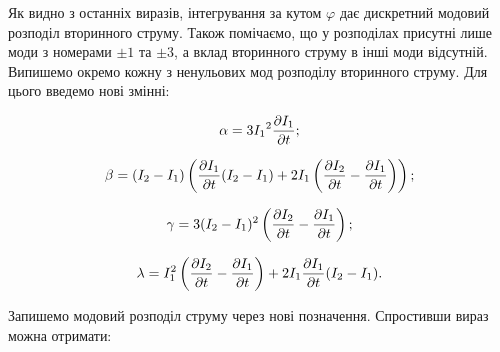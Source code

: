 Як видно з останніх виразів, інтегрування за кутом $ \varphi $ дає дискретний 
модовий розподіл вторинного струму.  Також помічаємо, що у розподілах присутні 
лише моди з номерами $ \pm 1 $ та $ \pm 3 $, а вклад вторинного струму в 
інші моди відсутній. Випишемо окремо кожну з ненульових мод розподілу 
вторинного струму. Для цього введемо нові змінні:

\begin{equation} \begin{aligned} \label{eq:alpha}
\alpha = 3 {I_1}^2 \frac{\partial I_1}{\partial t};
\end{aligned} \end{equation}

\begin{equation} \begin{aligned} \label{eq:beta}
\beta = ( I_2 - I_1 ) \left( \frac{\partial I_1}{\partial t} ( I_2 - I_1 ) + 
2 I_1 \left( \frac{\partial I_2}{\partial t} - \frac{\partial I_1}{\partial t} \right) \right);
\end{aligned} \end{equation}

\begin{equation} \begin{aligned} \label{eq:gamma}
\gamma = 3 ( I_2 - I_1 )^2 \left( \frac{\partial I_2}{\partial t} - \frac{\partial I_1}{\partial t} \right);
\end{aligned} \end{equation}

\begin{equation} \begin{aligned} \label{eq:lambda}
\lambda = I_1^2 \left( \frac{\partial I_2}{\partial t} - 
\frac{\partial I_1}{\partial t} \right) + 2 I_1 \frac{\partial I_1}{\partial t} (I_2 - I_1).
\end{aligned} \end{equation}

Запишемо модовий розподіл струму через нові позначення. Спростивши вираз 
можна отримати:

